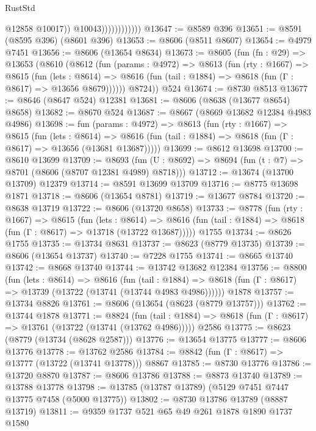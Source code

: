\begin{lexlean}{RustStd}
\begin{coremodule}
                                @12858
                                @10017))
                            @10043))))))))))))
@13647 := @8589 @396
@13651 := @8591 (@8595 @396) (@8601 @396)
@13653 := @8606 (@8511 @8607)
@13654 := @4979 @7451
@13656 := @8606 (@13654 @8634)
@13673 := @8605
    (fun (fn : @29) =>
    @13653
      (@8610
        (@8612
          (fun (params : @4972) =>
          @8613
            (fun (rty : @1667) =>
            @8615
              (fun (lets : @8614) =>
              @8616 (fun (tail : @1884) => @8618 (fun (Γ : @8617) => @13656 @8679))))))
        @8724))
    @524
@13674 := @8730 @8513
@13677 := @8646 (@8647 @524) @12381
@13681 := @8606 (@8638 (@13677 @8654) @8658)
@13682 := @8670 @524
@13687 := @8667 (@8669 @13682 @12384 @4983 @4986)
@13698 := fun (params : @4972) =>
  @8613
    (fun (rty : @1667) =>
    @8615
      (fun (lets : @8614) =>
      @8616 (fun (tail : @1884) => @8618 (fun (Γ : @8617) => @13656 (@13681 @13687)))))
@13699 := @8612 @13698
@13700 := @8610 @13699
@13709 := @8693
    (fun (U : @8692) => @8694 (fun (t : @7) => @8701 (@8606 (@8707 @12381 @4989) @8718)))
@13712 := @13674 (@13700 @13709) @12379
@13714 := @8591 @13699 @13709
@13716 := @8775 @13698 @1871
@13718 := @8606 (@13654 @8781)
@13719 := @13677 @8784
@13720 := @8638 @13719
@13722 := @8606 (@13720 @8658)
@13733 := @8778
    (fun (rty : @1667) =>
    @8615
      (fun (lets : @8614) =>
      @8616 (fun (tail : @1884) => @8618 (fun (Γ : @8617) => @13718 (@13722 @13687)))))
    @1755
@13734 := @8626 @1755
@13735 := @13734 @8631
@13737 := @8623 (@8779 @13735)
@13739 := @8606 (@13654 @13737)
@13740 := @7228 @1755
@13741 := @8665 @13740
@13742 := @8668 @13740
@13744 := @13742 @13682 @12384
@13756 := @8800
    (fun (lets : @8614) =>
    @8616
      (fun (tail : @1884) =>
      @8618 (fun (Γ : @8617) => @13739 (@13722 (@13741 (@13744 @4983 @4986))))))
    @1878
@13757 := @13734 @8826
@13761 := @8606 (@13654 (@8623 (@8779 @13757)))
@13762 := @13744 @1878
@13771 := @8824
    (fun (tail : @1884) => @8618 (fun (Γ : @8617) => @13761 (@13722 (@13741 (@13762 @4986)))))
    @2586
@13775 := @8623 (@8779 (@13734 (@8628 @2587)))
@13776 := @13654 @13775
@13777 := @8606 @13776
@13778 := @13762 @2586
@13784 := @8842 (fun (Γ : @8617) => @13777 (@13722 (@13741 @13778))) @8867
@13785 := @8730 @13776
@13786 := @13720 @8870
@13787 := @8606 @13786
@13788 := @8873 @13740
@13789 := @13788 @13778
@13798 := @13785 (@13787 @13789) (@5129 @7451 @7447 @13775 @7458 (@5000 @13775))
@13802 := @8730 @13786 @13789 (@8887 @13719)
@13811 := @9359 @1737 @521 @65 @49 @261 @1878 @1890 @1737 @1580

\end{coremodule}
\end{lexlean}
